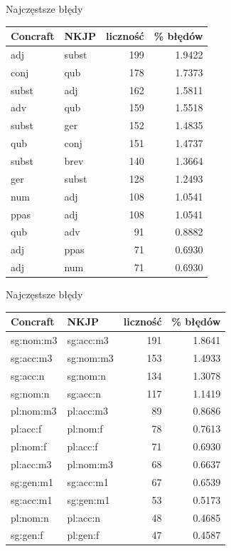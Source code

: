 \documentclass[xcolor=dvipsnames,polish]{beamer}
\begin{document}
\begin{frame}{Najczęstsze błędy}
  \begin{center}
  \begin{tabular}{llrr}
    Concraft & NKJP & liczność & \% błędów \\ \hline
    adj & subst & 199 & 1.9422 \\
    conj & qub & 178 & 1.7373 \\
    subst & adj & 162 & 1.5811 \\
    adv & qub & 159 & 1.5518 \\
    subst & ger & 152 & 1.4835 \\
    qub & conj & 151 & 1.4737 \\
    subst & brev & 140 & 1.3664 \\
    ger & subst & 128 & 1.2493 \\
    num & adj & 108 & 1.0541 \\
    ppas & adj & 108 & 1.0541 \\
    qub & adv & 91 & 0.8882 \\
    adj & ppas & 71 & 0.6930 \\
    adj & num & 71 & 0.6930 \\
  \end{tabular}
\end{center}
\end{frame}

\begin{frame}{Najczęstsze błędy}
  \begin{center}
  \begin{tabular}{llrr}
    Concraft & NKJP & liczność & \% błędów \\ \hline
    sg:nom:m3 & sg:acc:m3 & 191 & 1.8641 \\
    sg:acc:m3 & sg:nom:m3 & 153 & 1.4933 \\
    sg:acc:n & sg:nom:n & 134 & 1.3078 \\
    sg:nom:n & sg:acc:n & 117 & 1.1419 \\
    pl:nom:m3 & pl:acc:m3 & 89 & 0.8686 \\
    pl:acc:f & pl:nom:f & 78 & 0.7613 \\
    pl:nom:f & pl:acc:f & 71 & 0.6930 \\
    pl:acc:m3 & pl:nom:m3 & 68 & 0.6637 \\
    sg:gen:m1 & sg:acc:m1 & 67 & 0.6539 \\
    sg:acc:m1 & sg:gen:m1 & 53 & 0.5173 \\
    pl:nom:n & pl:acc:n & 48 & 0.4685 \\
    sg:gen:f & pl:gen:f & 47 & 0.4587 \\
  \end{tabular}
  \end{center}
\end{frame}
\end{document}
